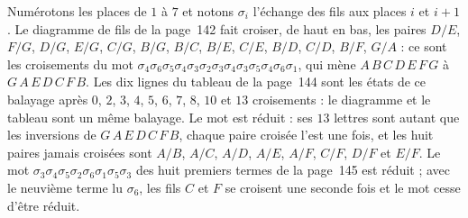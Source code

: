 \begin{encadre}
\begin{theoreme*}
Numérotons les places de $1$ à $7$ et notons $\sigma_i$ l'échange des fils aux places $i$ et $i+1$. Le diagramme de fils de la page~142 fait croiser, de haut en bas, les paires $D/E$, $F/G$, $D/G$, $E/G$, $C/G$, $B/G$, $B/C$, $B/E$, $C/E$, $B/D$, $C/D$, $B/F$, $G/A$ : ce sont les croisements du mot $\sigma_4\sigma_6\sigma_5\sigma_4\sigma_3\sigma_2\sigma_3\sigma_4\sigma_3\sigma_5\sigma_4\sigma_6\sigma_1$, qui mène $A\,B\,C\,D\,E\,F\,G$ à $G\,A\,E\,D\,C\,F\,B$. Les dix lignes du tableau de la page~144 sont les états de ce balayage après $0$, $2$, $3$, $4$, $5$, $6$, $7$, $8$, $10$ et $13$ croisements : le diagramme et le tableau sont un même balayage. Le mot est réduit : ses $13$ lettres sont autant que les inversions de $G\,A\,E\,D\,C\,F\,B$, chaque paire croisée l'est une fois, et les huit paires jamais croisées sont $A/B$, $A/C$, $A/D$, $A/E$, $A/F$, $C/F$, $D/F$ et $E/F$. Le mot $\sigma_3\sigma_4\sigma_5\sigma_2\sigma_6\sigma_1\sigma_5\sigma_3$ des huit premiers termes de la page~145 est réduit ; avec le neuvième terme lu $\sigma_6$, les fils $C$ et $F$ se croisent une seconde fois et le mot cesse d'être réduit.
\end{theoreme*}
\end{encadre}
